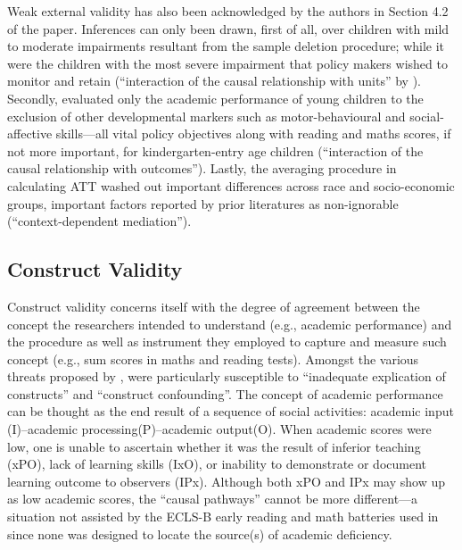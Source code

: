 Weak external validity has also been acknowledged by the authors in Section 4.2 of the paper. Inferences can only been drawn, first of all, over children with mild to moderate impairments resultant from the sample deletion procedure; while it were the children with the most severe impairment that policy makers wished to monitor and retain (``interaction of the causal relationship with units'' by \textcite{shadish:2002}). Secondly, \textcite{sullivan:2013} evaluated only the academic performance of young children to the exclusion of other developmental markers such as motor-behavioural and social-affective skills---all vital policy objectives along with reading and maths scores, if not more important, for kindergarten-entry age children (``interaction of the causal relationship with outcomes''). Lastly, the averaging procedure in calculating ATT washed out important differences across race and socio-economic groups, important factors reported by prior literatures as non-ignorable (``context-dependent mediation'').

\subsection{Construct Validity}

Construct validity concerns itself with the degree of agreement between the concept the researchers intended to understand (e.g., academic performance) and the procedure as well as instrument they employed to capture and measure such concept (e.g., sum scores in maths and reading tests). Amongst the various threats proposed by \textcite[][pp. 72--81]{shadish:2002}, \textcite{sullivan:2013} were particularly susceptible to ``inadequate explication of constructs'' and ``construct confounding''. The concept of academic performance can be thought as the end result of a sequence of social activities: academic input (I)--academic processing(P)--academic output(O). When academic scores were low, one is unable to ascertain whether it was the result of inferior teaching (xPO), lack of learning skills (IxO), or inability to demonstrate or document learning outcome to observers (IPx). Although both xPO and IPx may show up as low academic scores, the ``causal pathways'' cannot be more different---a situation not assisted by the ECLS-B early reading and math batteries used in \textcite{sullivan:2013} since none was designed to locate the source(s) of academic deficiency.

